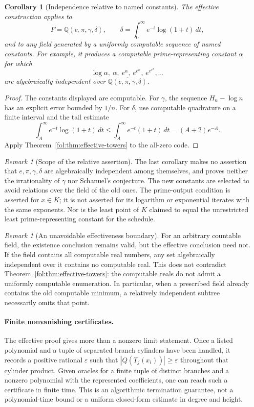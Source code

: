 \documentclass[11pt,a4paper]{article}
\newtheorem{corollary}[theorem]{Corollary}
\theoremstyle{definition}
\theoremstyle{remark}
\newtheorem{remark}[theorem]{Remark}
\numberwithin{equation}{section}
\begin{document}
\begin{corollary}[Independence relative to named constants]
\label{fol:cor:named-constants}
The effective construction applies to
\[
 F=\mathbb Q(e,\pi,\gamma,\delta),\qquad
 \delta=\int_0^\infty e^{-t}\log(1+t)\,dt,
\]
and to any field generated by a uniformly computable sequence of named
constants. For example, it produces a computable prime-representing
constant $\alpha$ for which
\[
 \log\alpha,\ \alpha,\ e^\alpha,\ e^{e^\alpha},\ e^{e^{e^\alpha}},\ldots
\]
are algebraically independent over
$\overline{\mathbb Q(e,\pi,\gamma,\delta)}$.
\end{corollary}
\begin{proof}
The constants displayed are computable. For $\gamma$, the sequence
$H_n-\log n$ has an explicit error bounded by $1/n$. For $\delta$, use
computable quadrature on a finite interval and the tail estimate
\[
 \int_A^\infty e^{-t}\log(1+t)\,dt
 \le\int_A^\infty e^{-t}(1+t)\,dt=(A+2)e^{-A}.
\]
Apply Theorem~\ref{fol:thm:effective-towers} to the all-zero code.
\end{proof}

\begin{remark}[Scope of the relative assertion]
The last corollary makes no assertion that $e,\pi,\gamma,\delta$ are
algebraically independent among themselves, and proves neither the
irrationality of $\gamma$ nor Schanuel's conjecture. The new constants
are selected to avoid relations over the field of the old ones. The
prime-output condition is asserted for $x\in K$; it is not asserted for
its logarithm or exponential iterates with the same exponents. Nor is the least
point of $K$ claimed to equal the unrestricted least prime-representing
constant for the schedule.
\end{remark}

\begin{remark}[An unavoidable effectiveness boundary]
For an arbitrary countable field, the existence conclusion remains
valid, but the effective conclusion need not. If the field contains
all computable real numbers, any set algebraically independent over it
contains no computable real. This does not contradict
Theorem~\ref{fol:thm:effective-towers}: the computable reals do not admit a
uniformly computable enumeration. In particular, when a prescribed
field already contains the old computable minimum, a relatively
independent subtree necessarily omits that point.
\end{remark}

\paragraph{Finite nonvanishing certificates.}
The effective proof gives more than a nonzero limit statement. Once a
listed polynomial and a tuple of separated branch cylinders have been
handled, it records a positive rational $\varepsilon$ such that
$|Q(T_j(x_i))|\ge\varepsilon$ throughout that cylinder product. Given
oracles for a finite tuple of distinct branches and a nonzero polynomial
with the represented coefficients, one can reach such a certificate in
finite time. This is an algorithmic termination guarantee, not a
polynomial-time bound or a uniform closed-form estimate in degree and
height.
\end{document}

